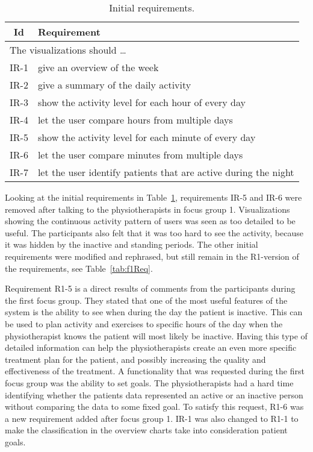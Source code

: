 \begin{table}[h!]
  \begin{center}
  \begin{tabular}{|c|p{12cm}|}
    \hline
      \textbf{Id} & \textbf{Requirement} \\ \hline
    \multicolumn{2}{|l|}{The visualizations should \ldots} \\ \hline
      IR-1 & give an overview of the week \\ \hline
      IR-2 & give a summary of the daily activity \\ \hline
      IR-3 & show the activity level for each hour of every day \\ \hline
      IR-4 & let the user compare hours from multiple days \\ \hline
      IR-5 & show the activity level for each minute of every day \\ \hline
      IR-6 & let the user compare minutes from multiple days \\ \hline
      IR-7 & let the user identify patients that are active during the night \\ \hline
  \end{tabular}
  \end{center}
  \caption[Initial requirements]{Initial requirements.}
  \label{tab:initReq}
\end{table}

Looking at the initial requirements in Table~\ref{tab:initReq}, requirements IR-5 and IR-6 were removed after talking to the physiotherapists in focus group 1. Visualizations showing the continuous activity pattern of users was seen as too detailed to be useful. The participants also felt that it was too hard to see the activity, because it was hidden by the inactive and standing periods. The other initial requirements were modified and rephrased, but still remain in the R1-version of the requirements, see Table~\ref{tab:f1Req}. 

Requirement R1-5 is a direct results of comments from the participants during the first focus group. They stated that one of the most useful features of the system is the ability to see when during the day the patient is inactive. This can be used to plan activity and exercises to specific hours of the day when the physiotherapist knows the patient will most likely be inactive. Having this type of detailed information can help the physiotherapists create an even more specific treatment plan for the patient, and possibly increasing the quality and effectiveness of the treatment. A functionality that was requested during the first focus group was the ability to set goals. The physiotherapists had a hard time identifying whether the patients data represented an active or an inactive person without comparing the data to some fixed goal. To satisfy this request, R1-6 was a new requirement added after focus group 1. IR-1 was also changed to R1-1 to make the classification in the overview charts take into consideration patient goals.

